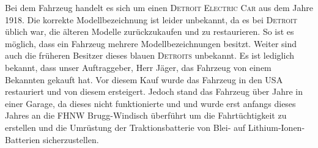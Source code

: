 Bei dem Fahrzeug handelt es sich um einen \textsc{Detroit Electric Car} aus dem Jahre 1918. Die korrekte Modellbezeichnung ist leider unbekannt, da es bei \textsc{Detroit} üblich war, die älteren Modelle zurückzukaufen und zu restaurieren. So ist es möglich, dass ein Fahrzeug mehrere Modellbezeichnungen besitzt. Weiter sind auch die früheren Besitzer dieses blauen \textsc{Detroits} unbekannt. Es ist lediglich bekannt, dass unser Auftraggeber, Herr Jäger, das Fahrzeug von einem Bekannten gekauft hat. Vor diesem Kauf wurde das Fahrzeug in den USA restauriert und von diesem ersteigert. Jedoch stand das Fahrzeug über Jahre in einer Garage, da dieses nicht funktionierte und und wurde erst anfangs dieses Jahres an die FHNW Brugg-Windisch überführt um die Fahrtüchtigkeit zu erstellen und die Umrüstung der Traktionsbatterie von Blei- auf Lithium-Ionen-Batterien sicherzustellen.

\newpage